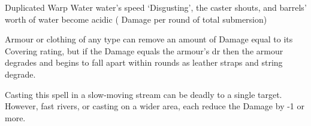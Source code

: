   {Duplicated}%
  {Warp}%
  {Water}%
  {water's speed}%
  {`Disgusting', the caster shouts, and  barrels' worth of water become acidic ( Damage per round of total submersion)}%
  {
    Armour or clothing of any type can remove an amount of Damage equal to its Covering rating, but if the Damage equals the armour's \gls{dr} then the armour degrades and begins to fall apart within  rounds as leather straps and string degrade.

    Casting this spell in a slow-moving stream can be deadly to a single target.
    However, fast rivers, or casting on a wider area, each reduce the Damage by -1 or more.
  }


